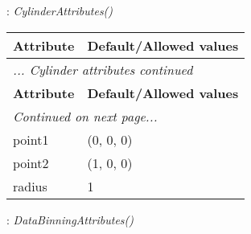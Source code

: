 \documentclass[10pt,a4paper]{report}
\begin{document}
\newpage

{}
: {\it CylinderAttributes() }\\[-3mm]

\begin{longtable}{ll}
{\bf Attribute} & {\bf Default/Allowed values} \\
\hline \hline
\endfirsthead
\multicolumn{2}{l}{{\it ... Cylinder attributes continued}} \\
{\bf Attribute} & {\bf Default/Allowed values} \\
\hline \hline
\endhead
\hline
\multicolumn{2}{l}{{\it Continued on next page...}} \\
\endfoot
\hline
\endlastfoot

point1  &  (0, 0, 0) \\
point2  &  (1, 0, 0) \\
radius  &  1 \\
\end{longtable}

\newpage

{}
: {\it DataBinningAttributes() }\\[-3mm]
\end{document}
